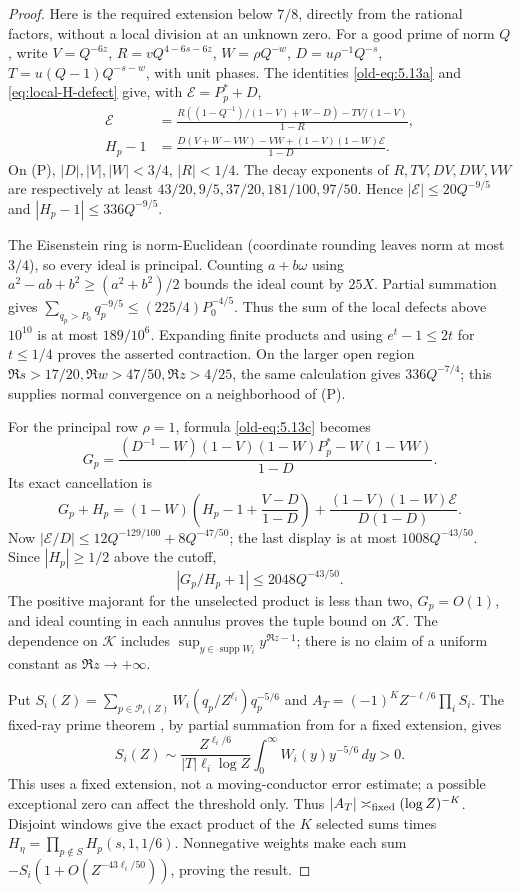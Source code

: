 \documentclass[12pt]{article}
\begin{document}
\begin{proof}
Here is the required extension below \(7/8\), directly from the
rational factors, without a local division at an unknown zero.
For a good prime of norm \(Q\), write
\(V=Q^{-6z}\), \(R=vQ^{4-6s-6z}\), \(W=\rho Q^{-w}\),
\(D=u\rho^{-1}Q^{-s}\), \(T=u(Q-1)Q^{-s-w}\), with unit phases.
The identities \eqref{old-eq:5.13a} and \eqref{eq:local-H-defect}
give, with \(\mathcal E=P_p^*+D\),
\[
 \begin{aligned}
 \mathcal E&=
 \frac{R((1-Q^{-1})/(1-V)+W-D)-TV/(1-V)}{1-R},\\
 H_p-1&=\frac{D(V+W-VW)-VW+(1-V)(1-W)\mathcal E}{1-D}.
 \end{aligned}
\]
On (P), \(|D|,|V|,|W|<3/4\), \(|R|<1/4\).
The decay exponents of \(R,TV,DV,DW,VW\) are respectively at least
\(43/20,9/5,37/20,181/100,97/50\).
Hence \(|\mathcal E|\le20Q^{-9/5}\) and
\(|H_p-1|\le336Q^{-9/5}\).

The Eisenstein ring is norm-Euclidean (coordinate rounding leaves
norm at most \(3/4\)), so every ideal is principal.
Counting \(a+b\omega\) using
\(a^2-ab+b^2\ge(a^2+b^2)/2\) bounds the ideal count by \(25X\).
Partial summation gives
\(\sum_{q_p>P_0}q_p^{-9/5}\le(225/4)P_0^{-4/5}\).
Thus the sum of the local defects above \(10^{10}\) is at most
\(189/10^6\).  Expanding finite products and using
\(e^t-1\le2t\) for \(t\le1/4\) proves the asserted contraction.
On the larger open region
\(\Re s>17/20,\Re w>47/50,\Re z>4/25\), the same calculation
gives \(336Q^{-7/4}\); this supplies normal convergence on a
neighborhood of (P).

For the principal row \(\rho=1\), formula \eqref{old-eq:5.13c} becomes
\[
 G_p=\frac{(D^{-1}-W)(1-V)(1-W)P_p^*-W(1-VW)}{1-D}.
\]
Its exact cancellation is
\[
 G_p+H_p=(1-W)\left(H_p-1+\frac{V-D}{1-D}\right)
       +\frac{(1-V)(1-W)\mathcal E}{D(1-D)}.
\]
Now \(|\mathcal E/D|\le12Q^{-129/100}+8Q^{-47/50}\);
the last display is at most \(1008Q^{-43/50}\).
Since \(|H_p|\ge1/2\) above the cutoff,
\[
 |G_p/H_p+1|\le2048Q^{-43/50}.
\]
The positive majorant for the unselected product is less than two, \(G_p=O(1)\),
and ideal counting in each annulus proves the tuple bound on
\(\mathcal K\).  The dependence on \(\mathcal K\) includes
\(\sup_{y\in\operatorname{supp}W_i}y^{\Re z-1}\);
there is no claim of a uniform constant as \(\Re z\to+\infty\).

Put \(S_i(Z)=\sum_{p\in\mathcal P_i(Z)}
 W_i(q_p/Z^{\ell_i})q_p^{-5/6}\) and
\(A_T=(-1)^KZ^{-\ell/6}\prod_iS_i\).
The fixed-ray prime theorem
\cite[Lemma 13.1]{QRH}, by partial summation from
\cite[Theorem 1.1]{TZ} for a fixed extension, gives
\[
 S_i(Z)\sim
 \frac{Z^{\ell_i/6}}{|T|\ell_i\log Z}
             \int_0^\infty W_i(y)y^{-5/6}\,dy>0.
\]
This uses a fixed extension, not a moving-conductor error estimate;
a possible exceptional zero can affect the threshold only.
Thus \(|A_T|\asymp_{\rm fixed}(\log Z)^{-K}\).
Disjoint windows give the exact product of the \(K\) selected
sums times \(H_\eta=\prod_{p\notin S}H_p(s,1,1/6)\).
Nonnegative weights make each sum
\(-S_i(1+O(Z^{-43\ell_i/50}))\), proving the result.
\end{proof}
\end{document}
